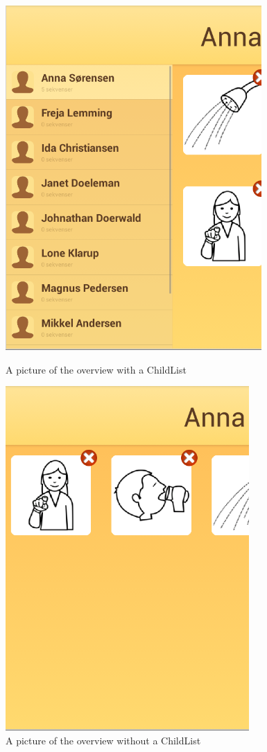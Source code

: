 \begin{figure}[h!]
\centering
\begin{minipage}{.45\textwidth}
\centering
\includegraphics[scale=0.9]{Pics/Sprint2/childlists/withList.png}
\caption{A picture of the overview with a ChildList}
\label{fig:withList}
\end{minipage}\hfill
\begin{minipage}{.45\textwidth}
\centering
\includegraphics[scale=0.9]{Pics/Sprint2/childlists/withoutList.png}
\caption{A picture of the overview without a ChildList}
\label{fig:withoutList}
\end{minipage}
\end{figure}

